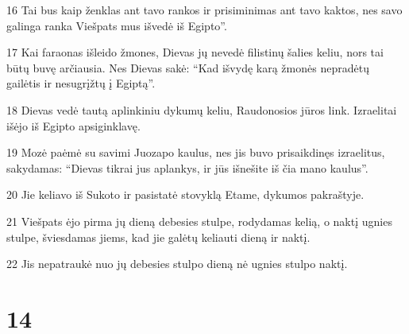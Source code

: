 \par 16 Tai bus kaip ženklas ant tavo rankos ir prisiminimas ant tavo kaktos, nes savo galinga ranka Viešpats mus išvedė iš Egipto”. 
\par 17 Kai faraonas išleido žmones, Dievas jų nevedė filistinų šalies keliu, nors tai būtų buvę arčiausia. Nes Dievas sakė: “Kad išvydę karą žmonės nepradėtų gailėtis ir nesugrįžtų į Egiptą”. 
\par 18 Dievas vedė tautą aplinkiniu dykumų keliu, Raudonosios jūros link. Izraelitai išėjo iš Egipto apsiginklavę. 
\par 19 Mozė paėmė su savimi Juozapo kaulus, nes jis buvo prisaikdinęs izraelitus, sakydamas: “Dievas tikrai jus aplankys, ir jūs išnešite iš čia mano kaulus”. 
\par 20 Jie keliavo iš Sukoto ir pasistatė stovyklą Etame, dykumos pakraštyje. 
\par 21 Viešpats ėjo pirma jų dieną debesies stulpe, rodydamas kelią, o naktį ugnies stulpe, šviesdamas jiems, kad jie galėtų keliauti dieną ir naktį. 
\par 22 Jis nepatraukė nuo jų debesies stulpo dieną nė ugnies stulpo naktį.



\chapter{14}

